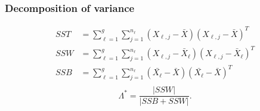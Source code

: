 \documentclass[aspectratio=169,10pt,t]{beamer}
\begin{document}
\begin{frame}[t]
	\frametitle{Decomposition of variance}
	\[
	\begin{aligned}
        SST &=
		\sum^{g}_{\ell=1} 
		\sum^{n_{\ell}}_{j=1} 
		\left( X_{\ell,j}- \bar{X} \right) 
		\left( X_{\ell,j}- \bar{X} \right) ^{T}\\
		SSW &=
		\sum^{g}_{\ell=1} 
		\sum^{n_{\ell}}_{j=1} 
		\left( X_{\ell,j}- \bar{X}_{\ell} \right) 
		\left( X_{\ell,j}- \bar{X}_{\ell} \right) ^{T}\\
		SSB &=
		\sum^{g}_{\ell=1} 
		\sum^{n_\ell}_{j=1} 
		\left( \bar{X_{\ell}}- \bar{X} \right) 
		\left( \bar{X_{\ell}}- \bar{X} \right) ^{T}\\
	\end{aligned}
	\] 
	\vspace{1cm}
    \pause
	\[
	\Lambda ^{*} = \frac{|SSW|}{|SSB + SSW |} 
	.\] 

\end{frame}
\end{document}

